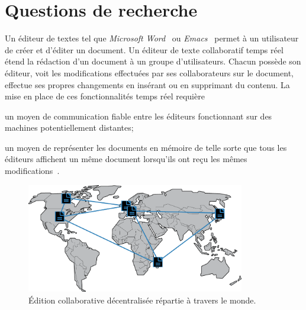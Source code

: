
\section{Questions de recherche}

Un éditeur de textes tel que \emph{Microsoft Word}~\cite{word} ou
\emph{Emacs}~\cite{emacs} permet à un utilisateur de créer et d'éditer un
document. Un éditeur de texte collaboratif temps réel~\cite{ellis1991groupware}
étend la rédaction d'un document à un groupe d'utilisateurs. Chacun possède son
éditeur, voit les modifications effectuées par ses collaborateurs sur le
document, effectue ses propres changements en insérant ou en supprimant du
contenu. La mise en place de ces fonctionnalités temps réel  requière
\begin{inparaenum}[(i)]
\item un moyen de communication fiable entre les éditeurs fonctionnant sur des
  machines potentiellement distantes;
\item un moyen de représenter les documents en mémoire de telle sorte que tous
  les éditeurs affichent un même document lorsqu'ils ont reçu les mêmes
  modifications~\cite{burckhardt2014replicated, shapiro2011conflict}.
\end{inparaenum}

\begin{figure}
  \begin{center}
    \includegraphics[width=0.85\textwidth]{img/world.png}
    \caption[Édition collaborative décentralisée]{\label{intro:img:world}Édition
      collaborative décentralisée répartie à travers le monde.}
  \end{center}
\end{figure}

